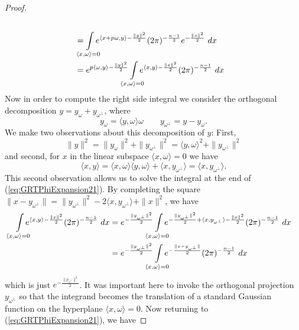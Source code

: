 \begin{proof}
\begin{equation}
\begin{split}
      \\&= \int\mclimits_{\langle x, \omega\rangle = 0} e^{\langle x + p\omega, y \rangle - \frac{\|y\|^2}2}(2\pi)^{-\frac{n-1}2}e^{-\frac{\|x\|^2}2} ~dx
      \\&= e^{p \langle \omega, y\rangle - \frac{\|y\|^2}2} \int\mclimits_{\langle x, \omega\rangle = 0}e^{\langle x, y\rangle - \frac{\|x\|^2}2} (2\pi)^{-\frac{n-1}2} ~dx
    \end{split}
  \end{equation}
  Now in order to compute the right side integral we consider the orthogonal decomposition $y = y_\omega + y_{\omega^\perp}$, where
  \[
    y_\omega = \langle y, \omega \rangle \omega \qquad y_{\omega^\perp} = y - y_\omega.
  \]
  We make two observations about this decomposition of $y$: First, 
  \begin{equation}\label{eq:GRTPhiExpansion22}
    \|y\|^2 
      = \|y_\omega\|^2 + \|y_{\omega^\perp}\|^2 
      = \langle y, \omega\rangle^2 + \|y_{\omega^\perp}\|^2
  \end{equation}
  and second, for $x$ in the linear subspace $\langle x, \omega\rangle = 0$ we have
  \[
    \langle x, y \rangle
      = \langle x, \omega \rangle \langle y, \omega \rangle + \langle x, y_{\omega^\perp} \rangle 
      = \langle x, y_{\omega^\perp} \rangle.
  \]
  This second observation allows us to solve the integral at the end of (\ref{eq:GRTPhiExpansion21}). By completing the square $\|x - y_{\omega^\perp}\| = \|y_{\omega^\perp}\|^2 - 2\langle x, y_{\omega^\perp} \rangle + \|x\|^2$, we have
  \begin{align*}
    \int\mclimits_{\langle x, \omega\rangle = 0}e^{\langle x, y\rangle - \frac{\|x\|^2}2} (2\pi)^{-\frac{n-1}2} ~dx
      &= e^{-\frac{\|y_{\omega^\perp}\|^2}2} \int\mclimits_{\langle x, \omega\rangle = 0}e^{-\frac{\|y_{\omega^\perp}\|^2}2 + \langle x, y_{\omega^\perp}\rangle - \frac{\|x\|^2}2} (2\pi)^{-\frac{n-1}2} ~dx
    \\&= e^{-\frac{\|y_{\omega^\perp}\|^2}2} \int\mclimits_{\langle x, \omega\rangle = 0}e^{-\frac{\|x - y_{\omega^\perp}\|}2} (2\pi)^{-\frac{n-1}2} ~dx
  \end{align*}
  which is just $e^{-\frac{\|p_{\omega^\perp}\|^2}2}$. It was important here to invoke the orthogonal projection $y_{\omega^\perp}$ so that the integrand becomes the translation of a standard Gaussian function on the hyperplane $\langle x, \omega \rangle = 0$. Now returning to (\ref{eq:GRTPhiExpansion21}), we have

\end{proof}
